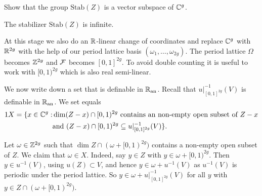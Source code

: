 \begin{exercise}
  Show that the group $\mathrm{Stab}(Z)$ is a vector subspace of
  ${\mathbb{C}}^g$. 
\end{exercise}

\begin{lemma}
  The stabilizer $\mathrm{Stab}(Z)$ is infinite. 
\end{lemma}

At this stage we also do an ${\mathbb{R}}$-linear change of coordinates and
replace ${\mathbb{C}}^g$ with ${\mathbb{R}}^{2g}$ with the help of our period lattice
basis $(\omega_1,\ldots,\omega_{2g})$.
The period lattice $\Omega$ becomes ${\mathbb{Z}}^{2g}$ and ${\mathcal F}$ becomes
$[0,1]^{2g}$. To avoid double counting it is useful to work with
$[0,1)^{2g}$ which is also real semi-linear. 

We now write down a set that is definable in ${{\mathbb{R}}_{\mathrm{an}}}$.
Recall that
 $u|_{[0,1]^{2g}}^{-1}(V)$ is definable in ${{\mathbb{R}}_{\mathrm{an}}}$.
We set equals
\begin{alignat*}1  
  X =  \{x \in\IC^g : &\dim (Z-x)\cap[0,1)^{2g}\text{ contains an
    non-empty open subset of $Z-x$}\\
  &\text{and } (Z-x)\cap [0,1)^{2g} \subset u|_{[0,1]^{2g}}^{-1}(V)\}. 
\end{alignat*}


Let $\omega \in{\mathbb{Z}}^{2g}$
such that $\dim Z\cap (\omega+[0,1)^{2g})$ contains a non-empty open
subset of $Z$.
We claim that $\omega\in X$.
Indeed, say $y\in Z$ with $y\in \omega+[0,1)^{2g}$.
Then $y\in u^{-1}(V)$, using $u(Z)\subset V$, and hence
$y \in \omega+u^{-1}(V)$ as $u^{-1}(V)$ is periodic under the period
lattice. So $y \in \omega+u|_{[0,1]^{2g}}^{-1}(V)$
for all $y$ with $y\in Z\cap (\omega+[0,1)^{2g})$. 

